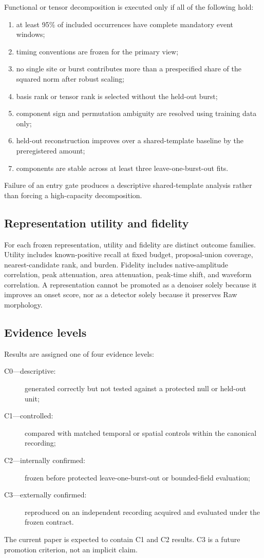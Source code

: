 Functional or tensor decomposition is executed only if all of the following hold:
\begin{enumerate}
  \item at least 95\% of included occurrences have complete mandatory event windows;
  \item timing conventions are frozen for the primary view;
  \item no single site or burst contributes more than a prespecified share of the squared norm after robust scaling;
  \item basis rank or tensor rank is selected without the held-out burst;
  \item component sign and permutation ambiguity are resolved using training data only;
  \item held-out reconstruction improves over a shared-template baseline by the preregistered amount;
  \item components are stable across at least three leave-one-burst-out fits.
\end{enumerate}
Failure of an entry gate produces a descriptive shared-template analysis rather than forcing a high-capacity decomposition.

\subsection{Representation utility and fidelity}

For each frozen representation, utility and fidelity are distinct outcome families. Utility includes known-positive recall at fixed budget, proposal-union coverage, nearest-candidate rank, and burden. Fidelity includes native-amplitude correlation, peak attenuation, area attenuation, peak-time shift, and waveform correlation. A representation cannot be promoted as a denoiser solely because it improves an onset score, nor as a detector solely because it preserves Raw morphology.

\subsection{Evidence levels}

Results are assigned one of four evidence levels:
\begin{description}
  \item[C0---descriptive:] generated correctly but not tested against a protected null or held-out unit;
  \item[C1---controlled:] compared with matched temporal or spatial controls within the canonical recording;
  \item[C2---internally confirmed:] frozen before protected leave-one-burst-out or bounded-field evaluation;
  \item[C3---externally confirmed:] reproduced on an independent recording acquired and evaluated under the frozen contract.
\end{description}
The current paper is expected to contain C1 and C2 results. C3 is a future promotion criterion, not an implicit claim.

